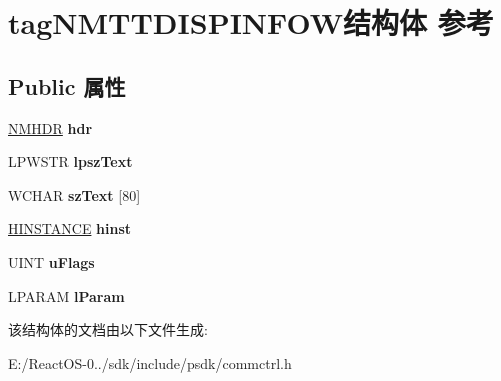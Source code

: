 \hypertarget{structtag_n_m_t_t_d_i_s_p_i_n_f_o_w}{}\section{tag\+N\+M\+T\+T\+D\+I\+S\+P\+I\+N\+F\+O\+W结构体 参考}
\label{structtag_n_m_t_t_d_i_s_p_i_n_f_o_w}
\subsection*{Public 属性}
\begin{DoxyCompactItemize}
\item 
\mbox{\label{structtag_n_m_t_t_d_i_s_p_i_n_f_o_w_aae8569ee4a2c819495b82e976dd0812d}} 
\hyperlink{structtag_n_m_h_d_r}{N\+M\+H\+DR} {\bfseries hdr}
\item 
\mbox{\label{structtag_n_m_t_t_d_i_s_p_i_n_f_o_w_aefff8135e288a14ad5fd37186efde6b8}} 
L\+P\+W\+S\+TR {\bfseries lpsz\+Text}
\item 
\mbox{\label{structtag_n_m_t_t_d_i_s_p_i_n_f_o_w_a7a7b95d7a79e20cca3a99768e6a26d96}} 
W\+C\+H\+AR {\bfseries sz\+Text} \mbox{[}80\mbox{]}
\item 
\mbox{\label{structtag_n_m_t_t_d_i_s_p_i_n_f_o_w_a08c0be98087b0e35f311a6dce09e2276}} 
\hyperlink{interfacevoid}{H\+I\+N\+S\+T\+A\+N\+CE} {\bfseries hinst}
\item 
\mbox{\label{structtag_n_m_t_t_d_i_s_p_i_n_f_o_w_ad7904e39d08b210ae4ae63c984c1f270}} 
U\+I\+NT {\bfseries u\+Flags}
\item 
\mbox{\label{structtag_n_m_t_t_d_i_s_p_i_n_f_o_w_a117c5ead9d90c83c2037b6672a16a375}} 
L\+P\+A\+R\+AM {\bfseries l\+Param}
\end{DoxyCompactItemize}


该结构体的文档由以下文件生成\+:\begin{DoxyCompactItemize}
\item 
E\+:/\+React\+O\+S-\/0../sdk/include/psdk/commctrl.\+h\end{DoxyCompactItemize}
